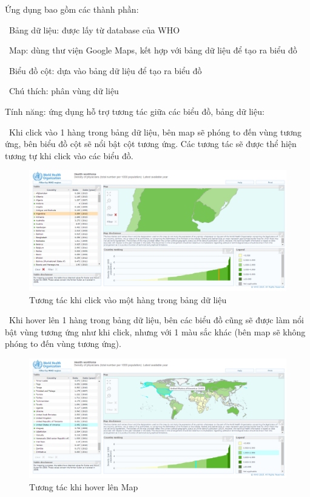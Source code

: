 \documentclass[12pt,a4paper]{article}
\begin{document}
Ứng dụng\cite{ghaex} bao gồm các thành phần:

\indent \indent \textbullet \ Bảng dữ liệu: được lấy từ database của WHO

\indent \indent \textbullet \ Map: dùng thư viện Google Maps, kết hợp với bảng dữ liệu để tạo ra biểu đồ

\indent \indent \textbullet \ Biểu đồ cột: dựa vào bảng dữ liệu để tạo ra biểu đồ

\indent \indent \textbullet \ Chú thích: phân vùng dữ liệu

Tính năng: ứng dụng hỗ trợ tương tác giữa các biểu đồ, bảng dữ liệu:

\indent \indent \textbullet \ Khi click vào 1 hàng trong bảng dữ liệu, bên map sẽ phóng to đến vùng tương ứng, bên biểu đồ cột sẽ nổi bật cột tương ứng. Các tương tác sẽ được thể hiện tương tự khi click vào các biểu đồ.
\begin{figure}[htp]
    \begin{center}
    \includegraphics[scale=.4]{image/clickatlas}
    \caption{Tương tác khi click vào một hàng trong bảng dữ liệu}
    \label{refhinh3}
    \end{center}
\end{figure}
\indent \indent \textbullet \ Khi hover lên 1 hàng trong bảng dữ liệu, bên các biểu đồ cũng sẽ được làm nổi bật vùng tương ứng như khi click, nhưng với 1 màu sắc khác (bên map sẽ không phóng to đến vùng tương ứng).
\begin{figure}[htp]
    \begin{center}
    \includegraphics[scale=.4]{image/hoveratlas}
    \caption{Tương tác khi hover lên Map}
    \label{refhinh4}
    \end{center}
\end{figure}
\end{document}
